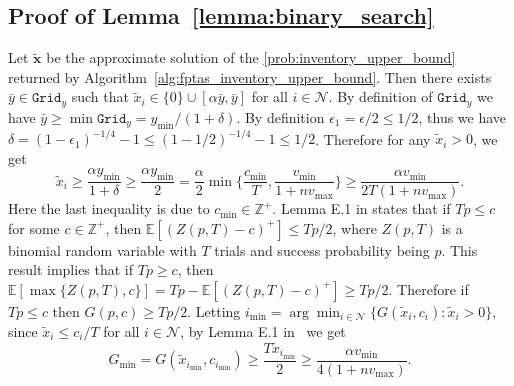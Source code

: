 \documentclass[mnsc,non-blindrev]{informs3}
\theoremstyle{definition}
\begin{document}
\begin{appendices}{\Large{}}
\subsection{Proof of Lemma~\ref{lemma:binary_search}}\label{sec:lemma:binary_search}

Let $\tilde{\bm{x}}$ be the approximate solution of the \ref{prob:inventory_upper_bound} returned by Algorithm~\ref{alg:fptas_inventory_upper_bound}. Then there exists $\bar{y}\in\texttt{Grid}_y$ such that $\tilde{x}_i\in\{0\}\cup[\alpha\bar{y},\bar{y}]$ for all $i\in\mathcal{N}$. By definition of $\texttt{Grid}_y$ we have \mbox{$\bar{y}\geq \min \texttt{Grid}_y=y_{\min}/(1+\delta)$.} By definition $\epsilon_1=\epsilon/2\leq 1/2$, thus we have \mbox{$\delta=(1-\epsilon_1)^{-1/4}-1\leq (1-1/2)^{-1/4}-1\leq 1/2$.} Therefore for any $\tilde{x}_i>0$, we get $$\tilde{x}_i\geq \dfrac{\alpha y_{\min}}{1+\delta}\geq \dfrac{\alpha y_{\min}}{2}=\dfrac{\alpha}{2}\min\Big\{\dfrac{c_{\min}}{T},\dfrac{v_{\min}}{1+nv_{\max}}\Big\}\geq \dfrac{\alpha v_{\min}}{2T(1+nv_{\max})}.$$
Here the last inequality is due to $c_{\min}\in\mathbb{Z}^+$. Lemma E.1 in \cite{bai2022coordinated} states that if $Tp\leq c$ for some $c\in\mathbb{Z}^+$, then $\mathbb{E}[(Z(p,T)-c)^+]\leq Tp/2$, where $Z(p,T)$ is a binomial random variable with $T$ trials and success probability being $p$. This result implies that if $Tp\geq c$, then $\mathbb{E}[\max\{Z(p,T),c\}]=Tp-\mathbb{E}[(Z(p,T)-c)^+]\geq Tp/2$. Therefore if $Tp\leq c$ then $G(p,c)\geq Tp/2$. Letting $i_{\min}=\arg\min_{i\in\mathcal{N}}\{G(\tilde{x}_i,c_i):\tilde{x}_i>0\}$, since $\tilde{x}_i\leq c_i/T$ for all $i\in\mathcal{N}$, by Lemma E.1 in \cite{bai2022coordinated}~we get
\begin{equation*}
G_{\min}=G(\tilde{x}_{i_{\min}},c_{i_{\min}})\geq \dfrac{T\tilde{x}_{i_{\min}}}{2}\geq \dfrac{\alpha v_{\min}}{4(1+nv_{\max})}.
\end{equation*}


\end{appendices}
\end{document}
